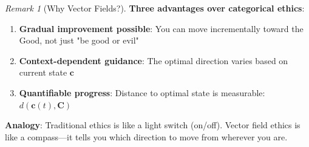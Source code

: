 \documentclass[11pt,a4paper]{article}
\theoremstyle{definition}
\theoremstyle{remark}
\newtheorem{remark}{Remark}[section]
\newcommand{\cc}{\mathbf{c}}
\begin{document}
\begin{remark}[Why Vector Fields?]
\textbf{Three advantages over categorical ethics}:

\begin{enumerate}
    \item \textbf{Gradual improvement possible}: You can move incrementally toward the Good, not just "be good or evil"
    \item \textbf{Context-dependent guidance}: The optimal direction varies based on current state \(\cc\)
    \item \textbf{Quantifiable progress}: Distance to optimal state is measurable: \(d(\cc(t), \mathbf{C})\)
\end{enumerate}

\textbf{Analogy}: Traditional ethics is like a light switch (on/off). Vector field ethics is like a compass—it tells you which direction to move from wherever you are.
\end{remark}
\end{document}
